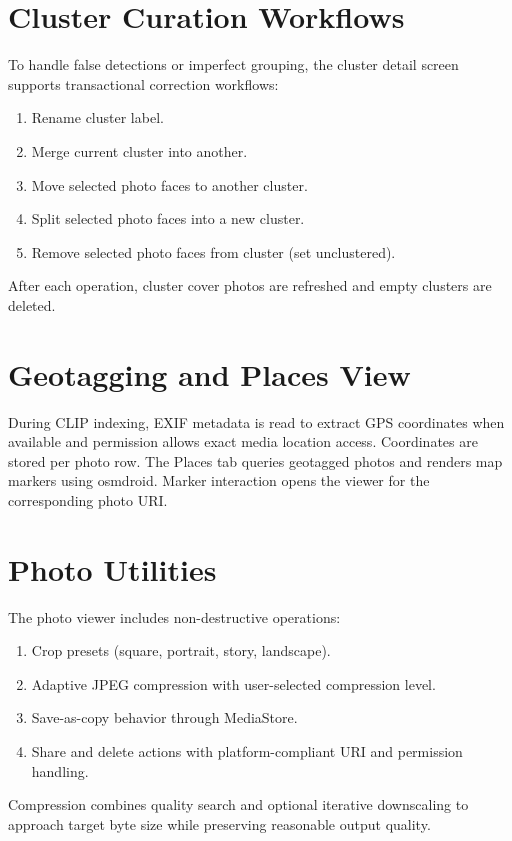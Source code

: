 \documentclass[conference]{IEEEtran}
\begin{document}
\section{Cluster Curation Workflows}
To handle false detections or imperfect grouping, the cluster detail screen supports transactional correction workflows:
\begin{enumerate}
\item Rename cluster label.
\item Merge current cluster into another.
\item Move selected photo faces to another cluster.
\item Split selected photo faces into a new cluster.
\item Remove selected photo faces from cluster (set unclustered).
\end{enumerate}

After each operation, cluster cover photos are refreshed and empty clusters are deleted.

\section{Geotagging and Places View}
During CLIP indexing, EXIF metadata is read to extract GPS coordinates when available and permission allows exact media location access. Coordinates are stored per photo row. The Places tab queries geotagged photos and renders map markers using osmdroid. Marker interaction opens the viewer for the corresponding photo URI.

\section{Photo Utilities}
The photo viewer includes non-destructive operations:
\begin{enumerate}
\item Crop presets (square, portrait, story, landscape).
\item Adaptive JPEG compression with user-selected compression level.
\item Save-as-copy behavior through MediaStore.
\item Share and delete actions with platform-compliant URI and permission handling.
\end{enumerate}

Compression combines quality search and optional iterative downscaling to approach target byte size while preserving reasonable output quality.
\end{document}
